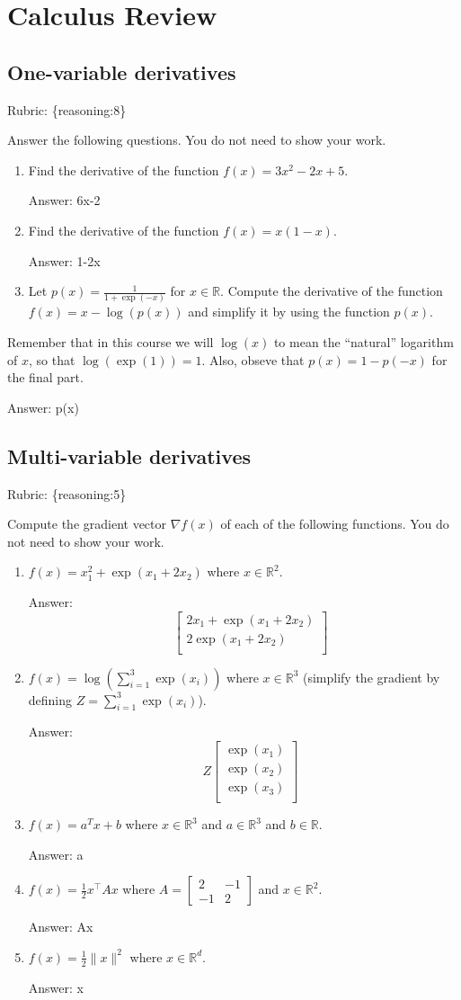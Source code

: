 \documentclass{article}
\def\rubric#1{\gre{Rubric: \{#1\}}}{}
\def\ans#1{\par\gre{Answer: #1}}
\def\blu#1{{\color{blu}#1}}
\def\gre#1{{\color{gre}#1}}
\def\norm#1{\|#1\|}
\def\R{\mathbb{R}}
\def\half{\frac 1 2}
\begin{document}
\section{Calculus Review}



\subsection{One-variable derivatives}
\label{sub.one.var}
\rubric{reasoning:8}

\blu{Answer the following questions.} You do not need to show your work.

\begin{enumerate}
\item Find the derivative of the function $f(x) = 3x^2 -2x + 5$.
\ans{6x-2}
\item Find the derivative of the function $f(x) = x(1-x)$.
\ans{1-2x}
\item Let $p(x) = \frac{1}{1+\exp(-x)}$ for $x \in \R$. Compute the derivative of the function $f(x) = x-\log(p(x))$ and simplify it by using the function $p(x)$.
\end{enumerate}
Remember that in this course we will $\log(x)$ to mean the ``natural'' logarithm of $x$, so that $\log(\exp(1)) = 1$. Also, obseve that $p(x) = 1-p(-x)$ for the final part.
\ans{p(x)}

\subsection{Multi-variable derivatives}
\label{sub.multi.var}
\rubric{reasoning:5}

\blu{Compute the gradient vector $\nabla f(x)$ of each of the following functions.} You do not need to show your work.
\begin{enumerate}
\item $f(x) = x_1^2 + \exp(x_1 + 2x_2)$ where $x \in \R^2$.
\ans{\[\quad
	\left[\begin{array}{c}
	2x_1+\exp(x_1 + 2x_2)\\
	2\exp(x_1 + 2x_2)\\
	\end{array}\right]\]}
\item $f(x) = \log\left(\sum_{i=1}^3\exp(x_i)\right)$ where $x \in \R^3$ (simplify the gradient by defining $Z = \sum_{i=1}^3\exp(x_i)$).
\ans{\[\quad
	Z\left[\begin{array}{c}
	\exp(x_1)\\
	\exp(x_2)\\
	\exp(x_3)\\
	\end{array}\right]\]}
\item $f(x) = a^Tx + b$ where $x \in \R^3$ and $a \in \R^3$ and $b \in \R$.
\ans{a}
\item $f(x) = \half x^\top A x$ where $A=\left[ \begin{array}{cc}
2 & -1 \\
 -1 & 2 \end{array} \right]$ and $x \in \mathbb{R}^2$.
 \ans{Ax}
 \item $f(x) = \frac{1}{2}\norm{x}^2$ where $x \in \R^d$.
  \ans{x}
\end{enumerate}
\end{document}
